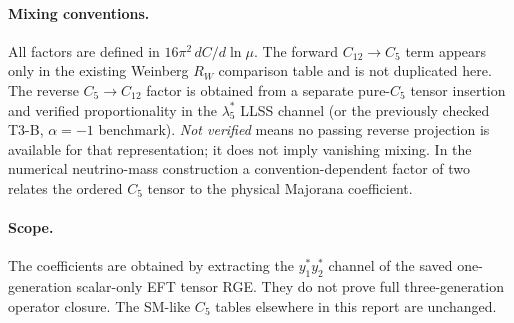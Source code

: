 \documentclass[9pt]{article}
\begin{document}
\paragraph{Mixing conventions.} All factors are defined in
$16\pi^2\,dC/d\ln\mu$. The forward $C_{12}\to C_5$ term
appears only in the existing Weinberg $R_W$ comparison table
and is not duplicated here. The reverse $C_5\to C_{12}$ factor
is obtained from a separate pure-$C_5$ tensor insertion and
verified proportionality in the $\lambda_5^*$ LLSS channel
(or the previously checked T3-B, $\alpha=-1$ benchmark).
\textit{Not verified} means no passing reverse projection is
available for that representation; it does not imply vanishing mixing.
In the numerical neutrino-mass construction a convention-dependent
factor of two relates the ordered $C_5$ tensor to the physical
Majorana coefficient.
\paragraph{Scope.} The coefficients are obtained by extracting the
$y_1^*y_2^*$ channel of the saved one-generation scalar-only EFT tensor
RGE. They do not prove full three-generation operator closure.
The SM-like $C_5$ tables elsewhere in this report are unchanged.
\end{document}
